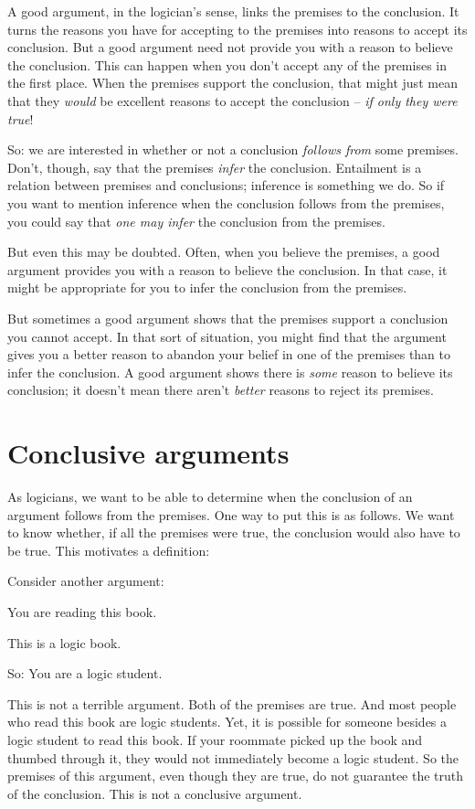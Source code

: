 A good argument, in the logician's sense, links the premises to the conclusion. It turns the reasons you have for accepting to the premises into reasons to accept its conclusion. But a good argument need not provide you with a reason to believe the conclusion. This can happen when you don't accept any of the premises in the first place. When the premises support the conclusion, that might just mean that they \emph{would} be excellent reasons to accept the conclusion – \emph{if only they were true}!

So: we are interested in whether or not a conclusion \emph{follows from} some premises. Don't, though, say that the premises \emph{infer} the conclusion. Entailment is a relation between premises and conclusions; inference is something we do. So if you want to mention inference when the conclusion follows from the premises, you could say that \emph{one may infer} the conclusion from the premises.

But even this may be doubted. Often, when you believe the premises, a good argument provides you with a reason to believe the conclusion. In that case, it might be appropriate for you to infer the conclusion from the premises.

But sometimes a good argument shows that the premises support a conclusion you cannot accept. In that sort of situation, you might find that the argument gives you a better reason to abandon your belief in one of the premises than to infer the conclusion. A good argument shows there is \emph{some} reason to believe its conclusion; it doesn't mean there aren't \emph{better} reasons to reject its premises. 


\section{Conclusive arguments} \label{s:conclusiveargs}
As logicians, we want to be able to determine when the conclusion of an argument follows from the premises. One way to put this is as follows. We want to know whether, if all the premises were true, the conclusion would also have to be true. This motivates a definition:



Consider another argument:
	\begin{earg}
		\item[] You are reading this book.
		\item[] This is a logic book.
		\item[So:] You are a logic student.
	\end{earg}
This is not a terrible argument. Both of the premises are true. And most people who read this book are logic students. Yet, it is possible for someone besides a logic student to read this book. If your roommate picked up the book and thumbed through it, they would not immediately become a logic student. So the premises of this argument, even though they are true, do not guarantee the truth of the conclusion. This is not a conclusive argument. 

